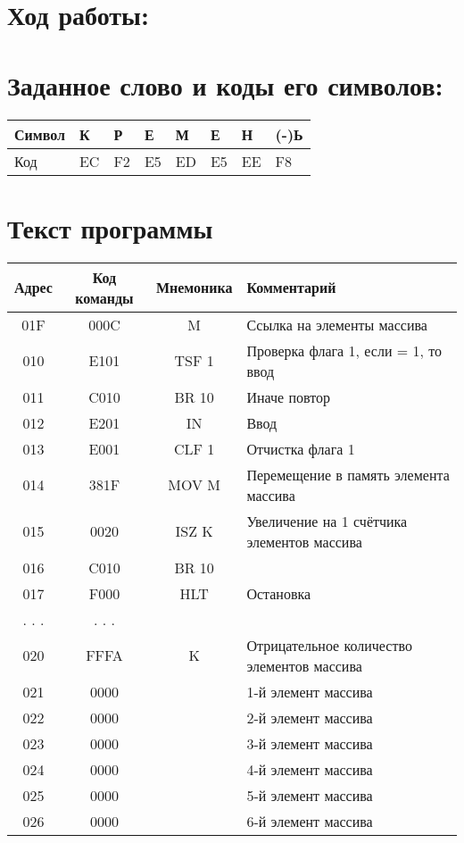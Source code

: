 \documentclass[a4paper,14pt]{article}
\begin{document}
\section*{Ход работы:}

\section {Заданное слово и коды его символов:}
\begin{tabular}{|l|l|l|l|l|l|l|l|}
    \hline
    \textbf{Символ} & \textbf{К} & \textbf{Р} & \textbf{Е} & \textbf{М} & \textbf{Е} & \textbf{Н} & \textbf{(-)Ь}\\
    \hline
    Код & EC & F2 & E5 & ED & E5 & EE & F8\\
    \hline
\end{tabular}

\section {Текст программы}
\begin{tabular}{|c|c|c|l|}
\hline
\textbf{Адрес} & \textbf{Код команды} & \textbf{Мнемоника} & \textbf{Комментарий} \\\hline
01F & 000C & M & Ссылка на элементы массива \\
010 & E101 & TSF 1 & Проверка флага 1, если = 1, то ввод \\
011 & C010 & BR 10 & Иначе повтор \\
012 & E201 & IN & Ввод \\
013 & E001 & CLF 1 & Отчистка флага 1 \\
014 & 381F & MOV M & Перемещение в память элемента массива \\
015 & 0020 & ISZ K & Увеличение на 1 счётчика элементов массива \\
016 & C010 & BR 10 &  \\
017 & F000 & HLT & Остановка \\
. . . & . . . &  &  \\
020 & FFFA & K & Отрицательное количество элементов массива \\
021 & 0000 &  & 1-й элемент массива \\
022 & 0000 &  & 2-й элемент массива \\
023 & 0000 &  & 3-й элемент массива \\
024 & 0000 &  & 4-й элемент массива \\
025 & 0000 &  & 5-й элемент массива \\
026 & 0000 &  & 6-й элемент массива \\
\hline
\end{tabular}
\end{document}
